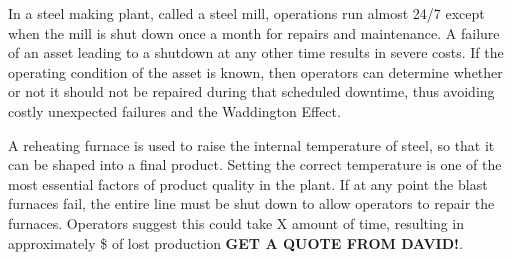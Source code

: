 In a steel making plant, called a steel mill, operations run almost 24/7 except when the mill is shut down once a month for repairs and maintenance.
A failure of an asset leading to a shutdown at any other time results in severe costs.
If the operating condition of the asset is known, then operators can determine whether or not it should not be repaired during that scheduled downtime,
thus avoiding costly unexpected failures and the Waddington Effect.


A reheating furnace is used to raise the internal temperature of steel, so that it can be shaped into a final product.
Setting the correct temperature is one of the most essential factors of product quality in the plant.
If at any point the blast furnaces fail, the entire line must be shut down to allow operators to repair the furnaces.
Operators suggest this could take X amount of time, resulting in approximately \$ of lost production \textbf{GET A QUOTE FROM DAVID!}.



